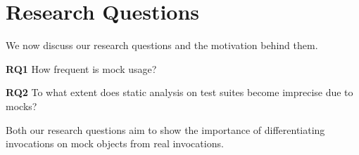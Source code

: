 \section{Research Questions}
\label{sec:rqs}

We now discuss our research questions and the motivation behind them. 

{\bf RQ1} How frequent is mock usage?

{\bf RQ2} To what extent does static analysis on test suites become imprecise due to mocks?

Both our research questions aim to show the importance of differentiating invocations on mock objects from real invocations.

